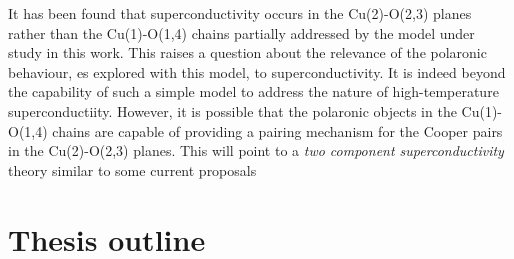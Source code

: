 It has been found that superconductivity occurs in the Cu(2)-O(2,3) planes rather than the Cu(1)-O(1,4) chains partially addressed by the model under study in this work.
This raises a question about the relevance of the polaronic behaviour, es explored with this model, to superconductivity.
It is indeed beyond the capability of such a simple model to address the nature of high-temperature superconductiity.
However, it is possible that the polaronic objects in the Cu(1)-O(1,4) chains are capable of providing a pairing mechanism for the Cooper pairs in the Cu(2)-O(2,3) planes.
This will point to a \textit{two component superconductivity} theory similar to some current proposals \cite{?}

\section{Thesis outline}
\label{sec:outline}

